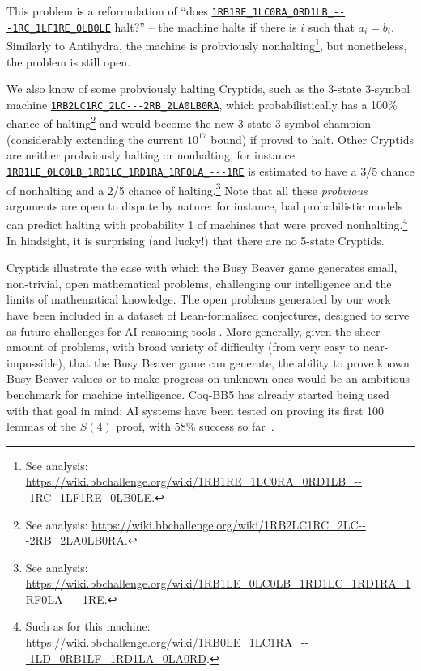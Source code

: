 \documentclass[sigconf,screen]{acmart}
\theoremstyle{definition} %
\numberwithin{equation}{section}
\theoremstyle{definition} %
\newcommand{\tm}[1]{\href{https://bbchallenge.org/#1}{\texttt{\nolinkurl{#1}}}}
\newcommand{\CoqBB}{Coq-BB5\xspace}
\begin{document}
This problem is a reformulation of  ``does \tm{1RB1RE_1LC0RA_0RD1LB_---1RC_1LF1RE_0LB0LE} halt?'' -- the machine halts if there is $i$ such that $a_i = b_i$. Similarly to Antihydra, the machine is probviously nonhalting\footnote{See analysis: {\scriptsize \url{https://wiki.bbchallenge.org/wiki/1RB1RE_1LC0RA_0RD1LB_---1RC_1LF1RE_0LB0LE}}. }, but nonetheless, the problem is still open.

We also know of some probviously halting Cryptids, such as the 3-state 3-symbol machine \tm{1RB2LC1RC_2LC---2RB_2LA0LB0RA}, which probabilistically  has a 100\% chance of halting\footnote{See analysis: {\scriptsize \url{https://wiki.bbchallenge.org/wiki/1RB2LC1RC_2LC---2RB_2LA0LB0RA}}.} and would become the new 3-state 3-symbol champion (considerably extending the current $10^{17}$ bound) if proved to halt. Other Cryptids are neither probviously halting or nonhalting, for instance \tm{1RB1LE_0LC0LB_1RD1LC_1RD1RA_1RF0LA_---1RE} is estimated to have a 3/5 chance of nonhalting and a 2/5 chance of halting.\footnote{See analysis: {\scriptsize \url{https://wiki.bbchallenge.org/wiki/1RB1LE_0LC0LB_1RD1LC_1RD1RA_1RF0LA_---1RE}}.} Note that all these \textit{probvious} arguments are open to dispute by nature: for instance, bad probabilistic models can predict halting with probability 1 of machines that were proved nonhalting.\footnote{Such as for this machine: \url{https://wiki.bbchallenge.org/wiki/1RB0LE_1LC1RA_---1LD_0RB1LF_1RD1LA_0LA0RD}.} In hindsight, it is surprising (and lucky!) that there are no 5-state Cryptids.

Cryptids illustrate the ease with which the Busy Beaver game generates small, non-trivial, open mathematical problems, challenging our intelligence and the limits of mathematical knowledge. The open problems generated by our work have been included in a dataset of Lean-formalised conjectures, designed to serve as future challenges for AI reasoning tools \cite{google-deepmind-formal-conjectures}. More generally, given the sheer amount of problems, with broad variety of difficulty (from very easy to near-impossible), that the Busy Beaver game can generate, the ability to prove known Busy Beaver values or to make progress on unknown ones would be an ambitious benchmark for machine intelligence. \CoqBB has already started being used with that goal in mind: AI systems have been tested on proving its first 100 lemmas of the $S(4)$ proof, with 58\% success so far~\cite{teodorescu2024nlir}.
\end{document}
